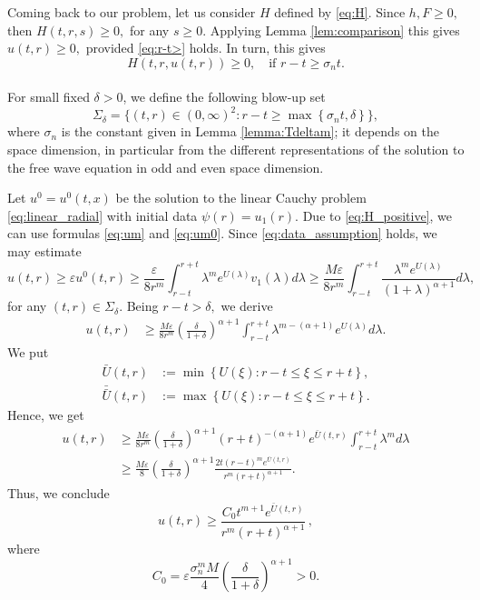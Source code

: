 \documentclass[11pt,reqno]{amsart}
\theoremstyle{definition}
\numberwithin{equation}{section}
\newcommand{\bbar}[1]{\bar{\bar{#1}}}
\renewcommand{\epsilon}{\varepsilon}
\newcommand{\e}{\varepsilon}
\begin{document}
Coming back to our problem, let us consider $H$ defined by \eqref{eq:H}. Since $h, F\geq 0,$ then $H(t,r,s)\geq 0,$ for any $s\geq 0.$ Applying Lemma \ref{lem:comparison} this gives $u(t,r)\geq 0,$ provided \eqref{eq:r-t>} holds. In turn,  this gives \begin{equation}\label{eq:H_positive}
H(t,r,u(t,r))\geq 0, \quad \text{if } r-t\geq \sigma_n t.
\end{equation}
\\
For small fixed $\delta>0$, we define the following blow-up set
\begin{equation}
\label{eq:sigma}
\Sigma_\delta =\Big\{(t,r)\in(0,\infty)^2: r-t\geq \max\left\{\sigma_n t,\delta\right\}\Big\},
\end{equation}
where $\sigma_n$ is the constant given in Lemma \ref{lemma:Tdeltam}; it depends on the space dimension, 
in particular from the different representations of the  solution to the  free wave equation in odd and even space dimension.

Let $u^0=u^0(t,x)$ be the solution to the linear Cauchy problem \eqref{eq:linear_radial} with initial data $\psi(r)=u_1(r)$.
Due to \eqref{eq:H_positive}, we can use formulas \eqref{eq:um} and \eqref{eq:um0}. Since \eqref{eq:data_assumption} holds, 
we may estimate 
\begin{equation*}
u(t,r)\geq \epsilon u^0(t,r)\geq \frac{\epsilon}{8r^m}\int_{r-t}^{r+t}\lambda^m e^{U(\lambda)}v_1(\lambda)d\lambda\geq \frac{M\epsilon}{8r^m}\int_{r-t}^{r+t}\frac{\lambda^m e^{U(\lambda)}}{(1+\lambda)^{\alpha+1}}d\lambda,\,
\end{equation*}
for any $(t,r)\in\Sigma_\delta.$
Being $r-t>\delta,$ we derive
\begin{align*}
u(t,r)&\geq 
\frac{M\e}{8r^m}\left(\frac{\delta}{1+\delta}\right)^{\alpha+1}\int_{r-t}^{r+t}\lambda^{m-(\alpha+1)} e^{U(\lambda)}d\lambda.
\end{align*}
We put
%
\begin{equation}
\label{eq:U_min_max}
    \begin{aligned}
\bar U(t,r)&:=\min\left\{U(\xi): r-t\leq\xi\leq r+t \right\},\\
\bbar U(t,r)&:=\max\left\{U(\xi): r-t\leq\xi\leq r+t \right\}.
\end{aligned}
\end{equation}
Hence, we get
\begin{align*}
u(t,r)&\geq \frac{M \epsilon}{8r^m}\left( \frac{\delta}{1+\delta}\right)^{\alpha+1}(r+t)^{-(\alpha+1)} e^{\bar{U}(t,r)}\int_{r-t}^{r+t}\lambda^{m} d\lambda \\
& \geq \frac{M\e}{8}\left( \frac{\delta}{1+\delta}\right)^{\alpha+1}
\frac{2t(r-t)^{m} e^{\bar U(t,r)}}{r^m(r+t)^{\alpha+1}}.
\end{align*}
Thus,  we conclude
\begin{equation}\label{eq:estimate_from_below}
u(t,r)\geq \frac{C_0t^{m+1}{e^{\bar U(t,r)}}}{r^m(r+t)^{\alpha+1}}\,,
\end{equation}
where 
\begin{equation}\label{eq:Czero}
C_0=\e\frac{\sigma_n^m M}{4}\left(\frac{\delta}{1+\delta}\right)^{\alpha+1}>0.
\end{equation}
\end{document}
